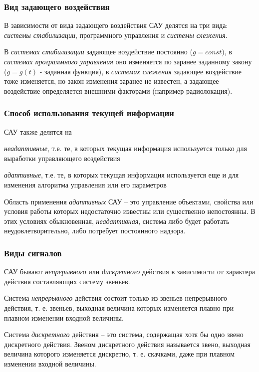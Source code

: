 \documentclass[../../TAU.tex]{subfiles}
\begin{document}
\subsubsection{Вид задающего воздействия}
    В зависимости от вида задающего воздействия САУ делятся на три вида: {\it системы стабилизации}, { программного управления} и {\it системы слежения}. \par
    В {\it системах стабилизации} задающее воздействие постоянно ($g = const$), в {\it системах программного управления} оно изменяется по заранее заданному закону ($g = g(t)$ - заданная функция), в {\it системах слежения} задающее воздействие тоже изменяется, но закон изменения заранее не известен, а задающее воздействие определяется внешними факторами (например радиолокация).

\subsubsection{Способ использования текущей информации \cite[стр. 19-20]{kim:uch}}
    САУ также делятся на \par
    {\it неадаптивные}, т.е.  те, в которых текущая информация используется только для выработки управляющего воздействия \par
    {\it адаптивные}, т.е. те, в которых текущая информация используется еще и для изменения алгоритма управления или его параметров\\\par
    Область применения {\it адаптивных} САУ – это управление объектами, свойства или условия работы которых недостаточно известны или существенно непостоянны. В этих условиях обыкновенная, {\it неадаптивная}, система либо будет работать неудовлетворительно, либо потребует постоянного надзора. 

\subsubsection{Виды сигналов}

    САУ бывают {\it непрерывного} или {\it дискретного} действия в зависимости от характера действия составляющих систему звеньев. \par
    Система {\it непрерывного} действия состоит только из звеньев непрерывного действия, т. е. звеньев, выходная величина которых изменяется плавно при плавном изменении входной величины. \par
    Система {\it дискретного}  действия – это система, содержащая хотя бы одно звено дискретного действия. Звеном дискретного действия называется звено, выходная величина которого изменяется дискретно, т. е. скачками, даже при плавном изменении входной величины.
\end{document}
